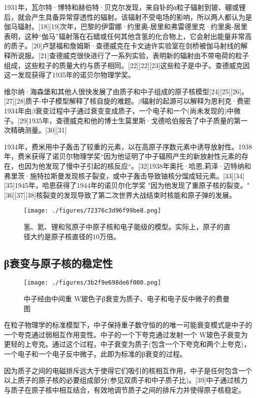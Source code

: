 1931年，瓦尔特·博特和赫伯特·贝克尔发现，来自钋的α粒子辐射到铍、硼或锂后，就会产生具备异常穿透性的辐射。该辐射不受电场的影响，所以两人都认为是伽马辐射。[18][19]次年，巴黎的伊雷娜·约里奥-居里和弗雷德里克·约里奥-居里表明，这种“伽马”辐射落在石蜡或任何其他含氢的化合物上，它会射出能量非常高的质子。[20]卢瑟福和詹姆斯·查德威克在卡文迪许实验室在剑桥被伽马射线的解释所说服。[21]查德威克很快进行了一系列实验，表明新的辐射由不带电荷的粒子组成，这些粒子的质量大约与质子相同。[22][22][23]这些粒子是中子。查德威克因这一发现获得了1935年的诺贝尔物理学奖。

维尔纳·海森堡和其他人很快发展了由质子和中子组成的原子核模型[24][25][26]。[27][28]质子-中子模型解释了核自旋的难题。$\beta$辐射的起源可以解释为恩利克·费密1934年由$\beta$衰变过程中子通过衰变变成质子，一个电子和一个(尚未发现的)中微子。[29]1935年，查德威克和他的博士生莫里斯·戈德哈伯报告了中子质量的第一次精确测量。[30][31]

1934年，费米用中子轰击了较重的元素，以在高原子序数元素中诱导放射性。1938年，费米获得了诺贝尔物理学奖“因为他证明了中子辐照产生的新放射性元素的存在，也因为他发现了慢中子引起的核反应“。[32]1938年奥托·哈恩,莉泽·迈特纳和弗里茨·施特拉斯曼发现核子裂变，或中子轰击导致铀核分馏成轻元素。[33][34][35]1945年，哈恩获得了1944年的诺贝尔化学奖 "因为他发现了重原子核的裂变。"[36][37][38]核裂变的发现导致了第二次世界大战结束时核能和原子弹的发展。
\begin{figure}[ht]
\centering
\texttt{[image: ./figures/72376c3d96f99be8.png]}
\caption{氢、氦、锂和氖原子中原子核和电子能级的模型。实际上，原子的直径大约是原子核直径的10万倍。} \label{fig_Neutro_2}
\end{figure}

\subsection{β衰变与原子核的稳定性}
\begin{figure}[ht]
\centering
\texttt{[image: ./figures/3b2f9e698de6f000.png]}
\caption{中子经由中间重 W玻色子β衰变为质子、电子和电子反中微子的费曼图} \label{fig_Neutro_3}
\end{figure}
在粒子物理学的标准模型下，中子保持重子数守恒的的唯一可能衰变模式是中子的一个夸克通过弱相互作用变性。中子的一个下夸克通过发射一个 W玻色子衰变为更轻的上夸克。通过这个过程，中子衰变为质子(包含一个下夸克和两个上夸克)，一个电子和一个电子反中微子。此即为标准的β衰变的过程。

因为质子之间的电磁排斥远大于使得它们吸引的核相互作用，中子是任何包含一个以上质子的原子核的必要组成部分(参见双质子和中子质子比)。[39]中子通过核力与质子在原子核中相互结合，有效地调节质子之间的排斥力并使得原子核稳定。

